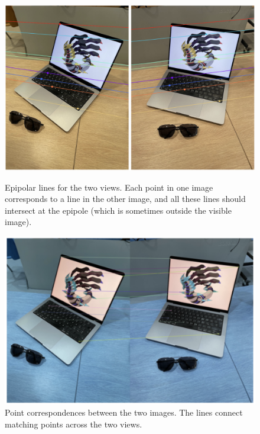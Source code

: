 \begin{figure}[htbp]
    \begin{minipage}[t]{0.45\textwidth}
        \centering
        \includegraphics[width=\linewidth]{img/epipolar.png}
        \caption{Epipolar lines for the two views. Each point in one image corresponds to a line in the other image, and all these lines should intersect at the epipole (which is sometimes outside the visible image).}
        \label{epipolar}
    \end{minipage}
    \hfill
    \begin{minipage}[t]{0.45\textwidth}
        \centering
        \includegraphics[width=\linewidth]{img/matches.png}
        \caption{Point correspondences between the two images. The lines connect matching points across the two views.}
        \label{matches}
    \end{minipage}
\end{figure}

